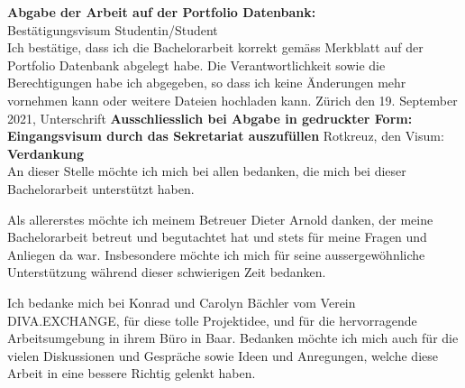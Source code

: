 \newpage
\noindent
\textbf{Abgabe der Arbeit auf der Portfolio Datenbank:}\\
Best\"atigungsvisum Studentin/Student\\
Ich best\"atige, dass ich die Bachelorarbeit korrekt gem\"ass Merkblatt auf der Portfolio Datenbank abgelegt habe. Die Verantwortlichkeit sowie die Berechtigungen habe ich abgegeben, so dass ich keine \"Anderungen mehr vornehmen kann oder weitere Dateien hochladen kann. \newline \newline
Zürich den 19. September 2021, Unterschrift       \underline{\hspace*{4cm}} \newline \newline
\noindent
{\textbf{Ausschliesslich bei Abgabe in gedruckter Form: \\
Eingangsvisum durch das Sekretariat auszuf\"ullen}} \newline \newline
Rotkreuz, den   \underline{\hspace*{4cm}} \hspace*{1cm} Visum:  \underline{\hspace*{4cm}} 
\newline \newline \newline
\textbf{Verdankung}\\
An dieser Stelle möchte ich mich bei allen bedanken, die mich bei dieser Bachelorarbeit unterstützt haben.

Als allererstes möchte ich meinem Betreuer Dieter Arnold danken, der meine Bachelorarbeit betreut und begutachtet hat und stets für meine Fragen und Anliegen da war. Insbesondere möchte ich mich für seine aussergewöhnliche Unterstützung während dieser schwierigen Zeit bedanken.

Ich bedanke mich bei Konrad und Carolyn Bächler vom Verein DIVA.EXCHANGE, für diese tolle Projektidee, und für die hervorragende Arbeitsumgebung in ihrem Büro in Baar. Bedanken möchte ich mich auch für die vielen Diskussionen und Gespräche sowie Ideen und Anregungen, welche diese Arbeit in eine bessere Richtig gelenkt haben.

